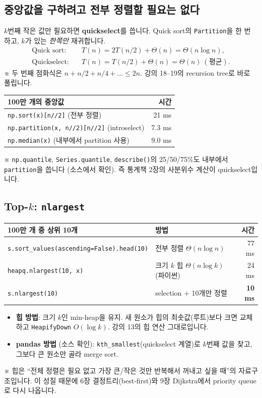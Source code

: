 \documentclass[11pt,a4paper]{article}
\newcommand{\term}[1]{\textbf{#1}}
\newcommand{\code}[1]{\texttt{#1}}
\newcommand{\aside}[1]{{\footnotesize\color{black!65}#1}}
\begin{document}
\subsection{중앙값을 구하려고 전부 정렬할 필요는 없다}
$k$번째 작은 값만 필요하면 \term{quickselect}를 씁니다. Quick sort의 \code{Partition}을 한 번 하고, $k$가 있는 \emph{한쪽만} 재귀합니다.
\begin{align*}
\text{Quick sort:}\quad & T(n)=2T(n/2)+\Theta(n)=\Theta(n\log n),\\
\text{Quickselect:}\quad & T(n)=T(n/2)+\Theta(n)=\Theta(n)\ (\text{평균}).
\end{align*}
\aside{※ 두 번째 점화식은 $n+n/2+n/4+\dots\le2n$. 강의 18–19의 recursion tree로 바로 풀립니다.}
\begin{center}
\begin{tabular}{@{}l r@{}}
\toprule
100만 개의 중앙값 & 시간 \\
\midrule
\code{np.sort(x)[n//2]} (전부 정렬) & 21 ms \\
\code{np.partition(x, n//2)[n//2]} (introselect) & 7.3 ms \\
\code{np.median(x)} (내부에서 partition 사용) & 9.0 ms \\
\bottomrule
\end{tabular}
\end{center}
\aside{※ \code{np.quantile}, \code{Series.quantile}, \code{describe()}의 25/50/75\%도 내부에서 \code{partition}을 씁니다 (소스에서 확인). 즉 통계책 2장의 사분위수 계산이 quickselect입니다.}

\subsection{Top-$k$: \code{nlargest}}
\begin{center}
\begin{tabular}{@{}l l r@{}}
\toprule
100만 개 중 상위 10개 & 방법 & 시간 \\
\midrule
\code{s.sort\_values(ascending=False).head(10)} & 전부 정렬 $\Theta(n\log n)$ & 77 ms \\
\code{heapq.nlargest(10, x)} & 크기 $k$ 힙 $\Theta(n\log k)$ (파이썬) & 24 ms \\
\code{s.nlargest(10)} & selection + 10개만 정렬 & \textbf{10 ms} \\
\bottomrule
\end{tabular}
\end{center}
\begin{itemize}
\item \textbf{힙 방법}: 크기 $k$인 min-heap을 유지. 새 원소가 힙의 최솟값(루트)보다 크면 교체하고 \code{HeapifyDown} $O(\log k)$. 강의 13의 힙 연산 그대로입니다.
\item \textbf{pandas 방법} (소스 확인): \code{kth\_smallest}(quickselect 계열)로 $k$번째 값을 찾고, 그보다 큰 원소만 골라 merge sort.
\end{itemize}
\aside{※ 힙은 ``전체 정렬은 필요 없고 가장 큰/작은 것만 반복해서 꺼내고 싶을 때''의 자료구조입니다. 이 성질 때문에 6장 결정트리(best-first)와 9장 Dijkstra에서 priority queue로 다시 나옵니다.}
\end{document}
